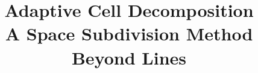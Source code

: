 \documentclass{article}
\title{Adaptive Cell Decomposition\\
A Space Subdivision Method Beyond Lines}
\begin{document}
\maketitle

%

%
%

\newpage
\begin{appendices}


\end{appendices}



\end{document}
